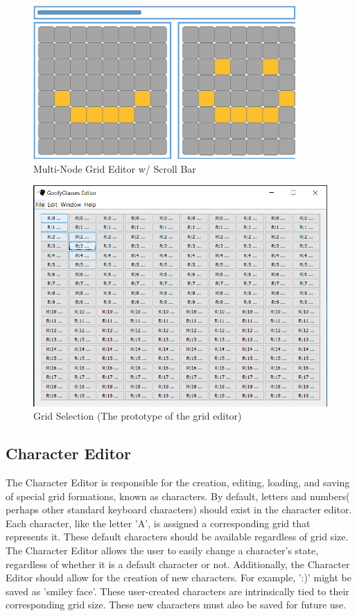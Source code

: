 \documentclass[12pt]{article}
\begin{document}
  	\begin{figure}[ht!]
  		\centering
  		\includegraphics[width=100mm]{Multi-grid.png}
  		\caption{Multi-Node Grid Editor w/ Scroll Bar}
  	\end{figure}    
  
    \begin{figure}[ht!]
      \centering
      \includegraphics[width=0.9\linewidth]{protoGrid.png}
      \caption{Grid Selection (The prototype of the grid editor)}
    \end{figure}
	\clearpage	
	
	\subsection { Character Editor}
  	The Character Editor is responsible for the creation, editing, loading, and saving of special grid formations, known as characters. By default, letters and numbers( perhaps other standard keyboard characters) should exist in the character editor. Each character, like the letter 'A', is assigned a corresponding grid that represents it.	
  	These default characters should be available regardless of grid size. The Character Editor allows the user to easily change a character's state, regardless of whether it is a default character or not.	
  	Additionally, the Character Editor should allow for the creation of new characters. For example, ':)' might be saved as 'smiley face'. These user-created characters are intrinsically tied to their corresponding grid size. These new characters must also be saved for future use.
	
\end{document}

